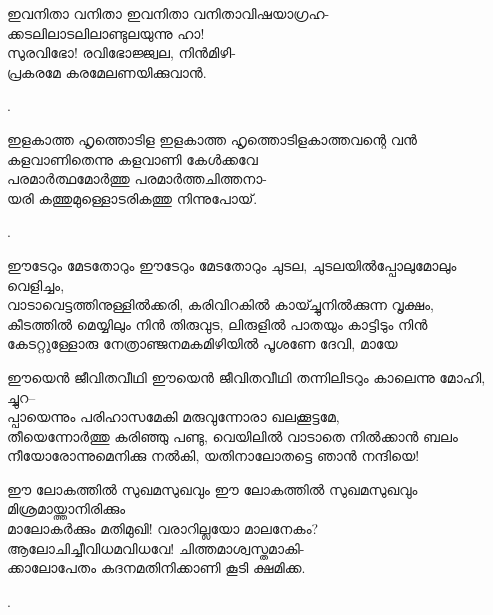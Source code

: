 \begin{enumerate}


\begin{slokam}{\VDv}{\VCBP}{ഇവനിതാ വനിതാ}
ഇവനിതാ വനിതാവിഷയാഗ്രഹ-\\
ക്കടലിലാടലിലാണ്ടുലയുന്നു ഹാ!\\
സുരവിഭോ! രവിഭോജ്ജ്വല, നിൻമിഴി-\\
പ്രകരമേ കരമേലണയിക്കുവാൻ.
\end{slokam}


. 


\begin{slokam}{\VMb}{\AUK}{ഇളകാത്ത ഹൃത്തൊടിള}
ഇളകാത്ത ഹൃത്തൊടിളകാത്തവന്റെ വൻ \\
കളവാണിതെന്നു കളവാണി കേള്‍ക്കവേ \\
പരമാർത്ഥമോർത്തു പരമാർത്തചിത്തനാ- \\
യരി കത്തുമുള്ളൊടരികത്തു നിന്നുപോയ്‌.
\end{slokam}


.

\begin{slokam}{\VSr}{\RV}{ഈടേറും മേടതോറും}
ഈടേറും മേടതോറും ചുടല, ചുടലയിൽ‌പ്പോലുമോലും വെളിച്ചം,\\
വാടാവെട്ടത്തിനുള്ളിൽക്കരി, കരിവിറകിൽ കായ്ച്ചുനിൽക്കുന്ന വൃക്ഷം,\\
കീടത്തിൽ മെയ്യിലും നിൻ തിരുവുട, ലിരുളിൽ പാതയും കാട്ടിടും നിൻ\\
കേടറ്റുള്ളോരു നേത്രാഞ്ജനമകമിഴിയിൽ‌ പൂശണേ ദേവി, മായേ
\end{slokam}


\begin{slokam}{\VSv}{\UN}{ഈയെൻ ജീവിതവീഥി}
ഈയെൻ ജീവിതവീഥി തന്നിലിടറും കാലെന്നു മോഹി, ച്ചുറ--\\
പ്പായെന്നും പരിഹാസമേകി മരുവുന്നോരാ ഖലക്കൂട്ടമേ,\\
തീയെന്നോർത്തു   കരിഞ്ഞു പണ്ടു,  വെയിലിൽ വാടാതെ നിൽക്കാൻ ബലം\\
നീയോരോന്നുമെനിക്കു നൽകി, യതിനാലോതട്ടെ ഞാൻ നന്ദിയെ!
\end{slokam}



\begin{slokam}{\VMk}{\KV}{ഈ ലോകത്തിൽ സുഖമസുഖവും}
ഈ ലോകത്തിൽ സുഖമസുഖവും മിശ്രമായ്ത്താനിരിക്കും\\
മാലോകർക്കും മതിമുഖി! വരാറില്ലയോ മാലനേകം?\\
ആലോചിച്ചീവിധമവിധവേ! ചിത്തമാശ്വസ്തമാകി-\\
ക്കാലോപേതം കദനമതിനിക്കാണി കൂടി ക്ഷമിക്ക.
\end{slokam}


.

\end{enumerate}

